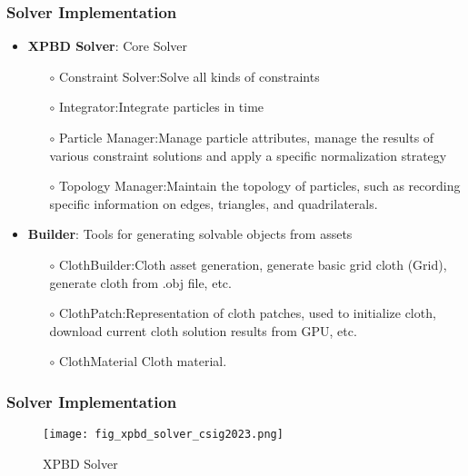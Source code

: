 \begin{frame}
    \frametitle{Solver Implementation}
\begin{itemize}
	\item \textbf{XPBD Solver}: Core Solver
	      \begin{itemize}
		      \item[$\circ$] Constraint Solver:Solve all kinds of constraints
		      \item[$\circ$] Integrator:Integrate particles in time
		      \item[$\circ$] Particle Manager:Manage particle attributes, manage the results of various constraint solutions and apply a specific normalization strategy
		      \item[$\circ$] Topology Manager:Maintain the topology of particles, such as recording specific information on edges, triangles, and quadrilaterals.
	      \end{itemize}
	\item \textbf{Builder}: Tools for generating solvable objects from assets
	      \begin{itemize}
		      \item[$\circ$] ClothBuilder:Cloth asset generation, generate basic grid cloth (Grid), generate cloth from .obj file, etc.
		      \item[$\circ$] ClothPatch:Representation of cloth patches, used to initialize cloth, download current cloth solution results from GPU, etc.
		      \item[$\circ$] ClothMaterial Cloth material.
	      \end{itemize}
\end{itemize}
\end{frame}

\begin{frame}
    \frametitle{Solver Implementation}
    \begin{figure}[H]
        \centering
        \texttt{[image: fig\_xpbd\_solver\_csig2023.png]}
        \caption{XPBD Solver}
    \end{figure}
\end{frame}